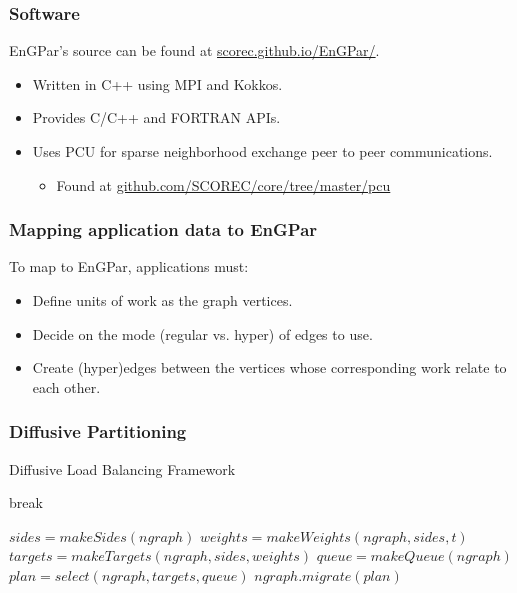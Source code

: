 \documentclass[aspectratio=169]{beamer}
\begin{document}
\begin{frame}
  \frametitle{Software}
  EnGPar's source can be found at \url{scorec.github.io/EnGPar/}.
  \begin{itemize}
  \item Written in C++ using MPI and Kokkos.
  \item Provides C/C++ and FORTRAN APIs.
  \item Uses PCU for sparse neighborhood exchange peer to peer communications.
    \begin{itemize}
      \item Found at \url{github.com/SCOREC/core/tree/master/pcu}
      \end{itemize}
  \end{itemize}
\end{frame}

\begin{frame}
  \frametitle{Mapping application data to EnGPar}
  To map to EnGPar, applications must:
  \begin{itemize}
  \item Define units of work as the graph vertices.
  \item Decide on the mode (regular vs. hyper) of edges to use.
  \item Create (hyper)edges between the vertices whose corresponding work relate to each other.
  \end{itemize}
\end{frame}


\begin{frame}
  \frametitle{Diffusive Partitioning}
  \begin{algorithm}[H]
    \caption{Diffusive Load Balancing Framework}
    \label{alg:engpar}
    \small
    \begin{algorithmic}[1]
      \State break
      \EndIf
      \EndWhile
      \EndFor
      \EndProcedure

      \State $sides = makeSides(ngraph)$
      \State $weights = makeWeights(ngraph,sides,t)$
      \State $targets = makeTargets(ngraph,sides,weights)$
      \State $queue = makeQueue(ngraph)$
      \State $plan = select(ngraph,targets,queue)$
      \State $ngraph.migrate(plan)$
      \EndProcedure
    \end{algorithmic}
  \end{algorithm}
\end{frame}
\end{document}

